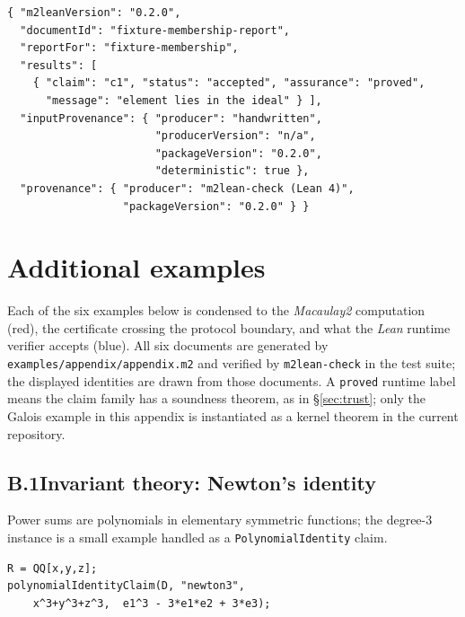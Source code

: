 \documentclass[11pt]{article}
\newcommand{\proved}{\textcolor{okgreen}{\code{proved}}}
\newcommand{\M}{\textit{Macaulay2}}
\newcommand{\lean}{\textit{Lean}}
\newcommand{\code}[1]{\texttt{#1}}
\begin{document}
\noindent\begin{minipage}{\linewidth}
\begin{lstlisting}[style=jsonstyle]
{ "m2leanVersion": "0.2.0",
  "documentId": "fixture-membership-report",
  "reportFor": "fixture-membership",
  "results": [
    { "claim": "c1", "status": "accepted", "assurance": "proved",
      "message": "element lies in the ideal" } ],
  "inputProvenance": { "producer": "handwritten",
                       "producerVersion": "n/a",
                       "packageVersion": "0.2.0",
                       "deterministic": true },
  "provenance": { "producer": "m2lean-check (Lean 4)",
                  "packageVersion": "0.2.0" } }
\end{lstlisting}
\end{minipage}

\section{Additional examples}\label{app:more}

Each of the six examples below is condensed to the \M{} computation
(\textcolor{m2col}{red}), the certificate crossing the protocol
boundary, and what the \lean{} runtime verifier accepts
(\textcolor{leancol}{blue}).  All six
documents are generated by
\code{examples/appendix/appendix.m2} and verified by
\code{m2lean-check} in the test suite; the displayed identities are
drawn from those documents.  A \proved{} runtime label means the claim
family has a soundness theorem, as in \S\ref{sec:trust}; only the
Galois example in this appendix is instantiated as a kernel theorem in
the current repository.

\newcommand{\verdictline}[2]{\noindent\textbf{Runtime verifier:}
\textcolor{okgreen}{$\checkmark$ accepted} [#1] --- #2\par}

\subsection*{B.1\quad Invariant theory: Newton's identity}

Power sums are polynomials in elementary symmetric functions; the
degree-3 instance is a small example handled as a
\code{PolynomialIdentity} claim.

\begin{lstlisting}[style=m2style]
R = QQ[x,y,z];
polynomialIdentityClaim(D, "newton3",
    x^3+y^3+z^3,  e1^3 - 3*e1*e2 + 3*e3);
\end{lstlisting}
\end{document}
